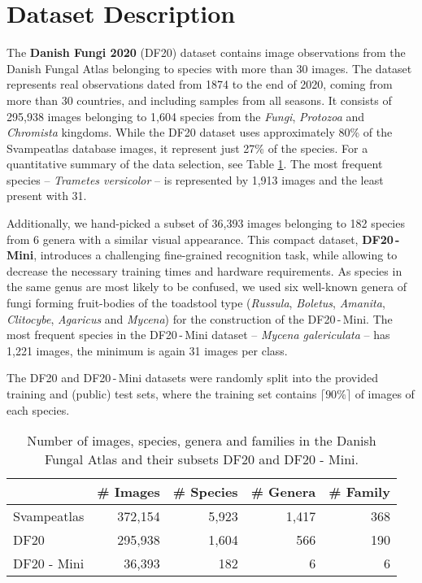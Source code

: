 \documentclass[10pt,twocolumn,letterpaper]{article}
\begin{document}
\section{Dataset Description}

The \textbf{Danish Fungi 2020} (DF20) dataset contains image observations from the Danish Fungal Atlas belonging to species with more than 30 images. 
The dataset represents real observations dated from 1874 to the end of 2020, coming from more than 30 countries, and  including samples from all seasons. It consists of 295,938 images belonging to 1,604 species from the \textit{Fungi}, \textit{Protozoa} and \textit{Chromista} kingdoms. While the DF20 dataset uses approximately 80\% of the Svampeatlas database images, it represent just 27\% of the species. For a quantitative summary of the data selection, see Table \ref{table:dataset_stats}.
The most frequent species -- \textit{Trametes versicolor} -- is represented by 1,913 images and the least present with 31.

Additionally, we hand-picked a subset of 36,393 images belonging to 182 species from 6 genera with a similar visual appearance. This compact dataset, \textbf{DF20\,-\,Mini}, introduces a challenging fine-grained recognition task, while allowing to decrease the necessary training times and hardware requirements.
As species in the same genus are most likely to be confused, we used six well-known genera of fungi forming fruit-bodies of the toadstool type (\textit{Russula}, \textit{Boletus}, \textit{Amanita}, \textit{Clitocybe}, \textit{Agaricus} and \textit{Mycena}) for the construction of the DF20\,-\,Mini. The most frequent species in the DF20\,-\,Mini dataset -- \textit{Mycena galericulata} -- has 1,221 images, the minimum is again 31 images per class. 

The DF20 and DF20\,-\,Mini datasets were randomly split into the provided training and (public) test sets, where the training set contains $\lceil 90 \% \rceil$ of images of each species.

\begin{table}[t]
\setlength{\tabcolsep}{0.325em}
\renewcommand{\arraystretch}{1.1}
\begin{center}
\begin{tabular}{|l|r|r|r|r|}
\cline{2-5}
\multicolumn{1}{l|}{ } & \multicolumn{1}{c|}{\# Images} &  \multicolumn{1}{c|}{\# Species} & \multicolumn{1}{c|}{\# Genera} & \multicolumn{1}{c|}{\# Family} \\
\hline
Svampeatlas   & 372,154 & 5,923 & 1,417 & 368 \\
DF20           & 295,938 & 1,604 &   566 & 190 \\
DF20 - Mini    &  36,393 &   182 &     6 &   6 \\
\hline
\end{tabular}
\end{center}
\caption{Number of images, species, genera and families in the Danish Fungal Atlas and their subsets DF20 and DF20 - Mini.}
\label{table:dataset_stats}
\end{table}
\end{document}
